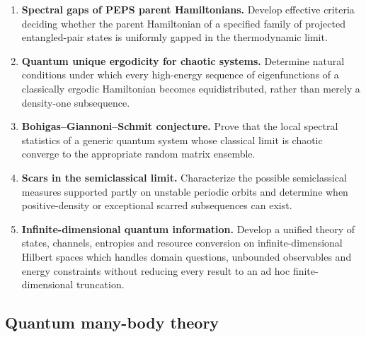 \documentclass{article}
\begin{document}
\begin{enumerate}[label=\textbf{M\arabic*.},leftmargin=*]
\item \precise{} \textbf{Spectral gaps of PEPS parent Hamiltonians.}
Develop effective criteria deciding whether the parent Hamiltonian of a
specified family of projected entangled-pair states is uniformly
gapped in the thermodynamic limit.

\item \precise{} \textbf{Quantum unique ergodicity for chaotic systems.}
Determine natural conditions under which every high-energy sequence of
eigenfunctions of a classically ergodic Hamiltonian becomes
equidistributed, rather than merely a density-one subsequence.

\item \precise{} \textbf{Bohigas--Giannoni--Schmit conjecture.}
Prove that the local spectral statistics of a generic quantum system
whose classical limit is chaotic converge to the appropriate random
matrix ensemble.

\item \precise{} \textbf{Scars in the semiclassical limit.}
Characterize the possible semiclassical measures supported partly on
unstable periodic orbits and determine when positive-density or
exceptional scarred subsequences can exist.

\item \formalism{} \textbf{Infinite-dimensional quantum information.}
Develop a unified theory of states, channels, entropies and resource
conversion on infinite-dimensional Hilbert spaces which handles domain
questions, unbounded observables and energy constraints without
reducing every result to an ad hoc finite-dimensional truncation.

\end{enumerate}


\subsection{Quantum many-body theory}
\end{document}
